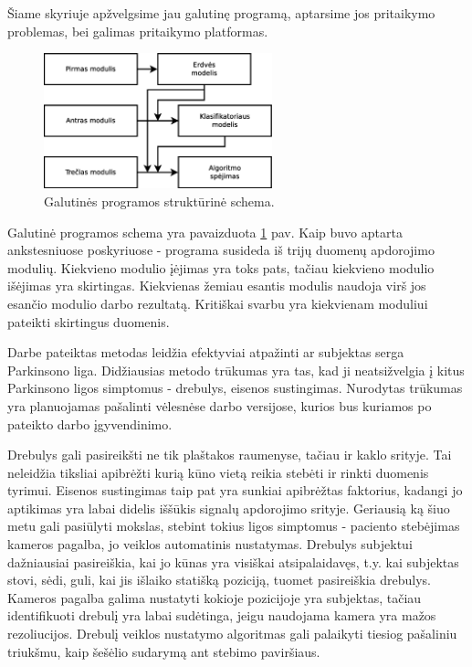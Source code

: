 \documentclass[]{vgtuef}
\begin{document}
Šiame skyriuje apžvelgsime jau galutinę programą, aptarsime jos pritaikymo problemas, bei galimas pritaikymo platformas.

\begin{figure}[!t]
  \centering
  \includegraphics[width=250px]{figures/galutine_programa.eps}
  \caption{Galutinės programos struktūrinė schema.}
  \label{fig:galutine_programa}
\end{figure}

Galutinė programos schema yra pavaizduota \ref{fig:galutine_programa} pav. Kaip buvo aptarta ankstesniuose poskyriuose - programa susideda iš trijų duomenų apdorojimo modulių. Kiekvieno modulio įėjimas yra toks pats, tačiau kiekvieno modulio išėjimas yra skirtingas. Kiekvienas žemiau esantis modulis naudoja virš jos esančio modulio darbo rezultatą. Kritiškai svarbu yra kiekvienam moduliui pateikti skirtingus duomenis.

Darbe pateiktas metodas leidžia efektyviai atpažinti ar subjektas serga Parkinsono liga. Didžiausias metodo trūkumas yra tas, kad ji neatsižvelgia į kitus Parkinsono ligos simptomus - drebulys, eisenos sustingimas. Nurodytas trūkumas yra planuojamas pašalinti vėlesnėse darbo versijose, kurios bus kuriamos po pateikto darbo įgyvendinimo.

Drebulys gali pasireikšti ne tik plaštakos raumenyse, tačiau ir kaklo srityje. Tai neleidžia tiksliai apibrėžti kurią kūno vietą reikia stebėti ir rinkti duomenis tyrimui. Eisenos sustingimas taip pat yra sunkiai apibrėžtas faktorius, kadangi jo aptikimas yra labai didelis iššūkis signalų apdorojimo srityje. Geriausią ką šiuo metu gali pasiūlyti mokslas, stebint tokius ligos simptomus - paciento stebėjimas kameros pagalba, jo veiklos automatinis nustatymas. Drebulys subjektui dažniausiai pasireiškia, kai jo kūnas yra visiškai atsipalaidavęs, t.y. kai subjektas stovi, sėdi, guli, kai jis išlaiko statišką poziciją, tuomet pasireiškia drebulys. Kameros pagalba galima nustatyti kokioje pozicijoje yra subjektas, tačiau identifikuoti drebulį yra labai sudėtinga, jeigu naudojama kamera yra mažos rezoliucijos. Drebulį veiklos nustatymo algoritmas gali palaikyti tiesiog pašaliniu triukšmu, kaip šešėlio sudarymą ant stebimo paviršiaus. 
\end{document}

